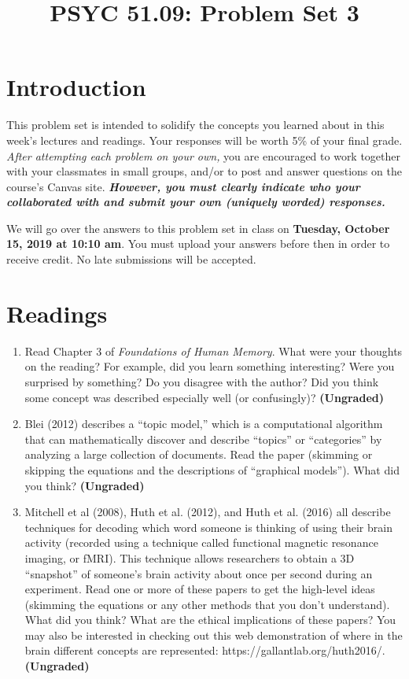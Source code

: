 \documentclass[11pt]{article}
\title{PSYC 51.09: Problem Set 3}
\date{}
\begin{document}
\maketitle
\vspace{-0.75in}
\section*{Introduction}
This problem set is intended to solidify the concepts you learned
about in this week’s lectures and readings.  Your responses will be
worth 5\% of your final grade.  \textit{After attempting each problem
  on your own,} you are encouraged to work together with your classmates in small groups, and/or to post and answer questions on the course’s Canvas site.  \textbf{\textit{However, you must clearly indicate who your collaborated with and submit your own (uniquely worded) responses.}}

We will go over the answers to this problem set in class on
\textbf{Tuesday, October 15, 2019 at 10:10 am}.  You must upload your answers before then in order to receive credit.  No late submissions will be accepted.

\section*{Readings}
\begin{enumerate}
\item Read Chapter 3 of \textit{Foundations of Human Memory}.  What were your thoughts on the reading?  For example, did you learn something interesting?  Were you surprised by something?  Do you disagree with the author?  Did you think some concept was described especially well (or confusingly)?  \textbf{(Ungraded)}
\item Blei (2012) describes a ``topic model,'' which is a computational algorithm that can mathematically discover and describe “topics” or “categories” by analyzing a large collection of documents.  Read the paper (skimming or skipping the equations and the descriptions of “graphical models”).  What did you think?  \textbf{(Ungraded)}
\item Mitchell et al (2008), Huth et al. (2012), and Huth et
  al. (2016) all describe techniques for decoding which word someone
  is thinking of using their brain activity (recorded using a
  technique called functional magnetic resonance imaging, or fMRI).
  This technique allows researchers to obtain a 3D “snapshot” of
  someone’s brain activity about once per second during an experiment.
  Read one or more of these papers to get the high-level ideas (skimming the equations or any
  other methods that you don't understand).  What did you think?  What
  are the ethical implications of these papers?  You may also be
  interested in checking out this web demonstration of where in the
  brain different concepts are represented:
  https://gallantlab.org/huth2016/.  \textbf{(Ungraded)}
\end{enumerate}
\end{document}
